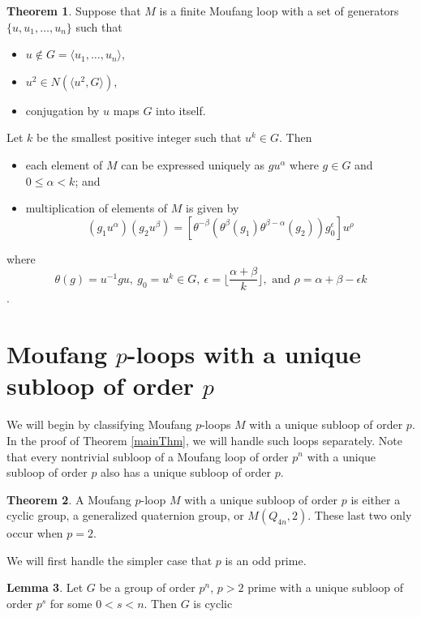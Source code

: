 \documentclass[12pt]{report}
\theoremstyle{definition}
\newtheorem{thm}{Theorem}[chapter]
\newtheorem{lem}[thm]{Lemma}
\begin{document}
\begin{thm}\label{thm-chein}
  Suppose that $M$ is a finite Moufang loop with a set of generators $\{u, u_1, \ldots, u_n\}$ such that
  \begin{itemize}
    \item $u\notin G = \langle u_1,\ldots, u_n\rangle$,
    \item $u^2\in N(\langle u^2, G\rangle)$,
    \item conjugation by $u$ maps $G$ into itself.
  \end{itemize}
  Let $k$ be the smallest positive integer such that $u^k\in G$. Then
  \begin{itemize}
    \item each element of $M$ can be expressed uniquely as $gu^\alpha$ where $g\in G$ and $0\leq \alpha < k$; and
    \item multiplication of elements of $M$ is given by
    \[(g_1u^\alpha)(g_2u^\beta) = [\theta^{-\beta}(\theta^\beta(g_1)\theta^{\beta - \alpha}(g_2))g_0^\epsilon]u^\rho\]
  \end{itemize}
  where
  \[\theta(g) = u^{-1}gu,\: g_0 = u^k\in G,\: \epsilon = \lfloor\frac{\alpha + \beta}{k}\rfloor,\text{ and }
    \rho = \alpha + \beta - \epsilon k\] \cite{Chein}.
\end{thm}


\section{Moufang $p$-loops with a unique subloop of order $p$}

We will begin by classifying Moufang $p$-loops $M$ with a unique subloop of order $p$. In the proof of
  Theorem \ref{mainThm}, we will handle such loops separately. Note that every nontrivial subloop of a
  Moufang loop of order $p^n$ with a unique subloop of order $p$ also has a unique subloop of order $p$.

\begin{thm}
    A Moufang $p$-loop $M$ with a unique subloop of order $p$ is either a cyclic group, a generalized
      quaternion group, or $M(Q_{4n}, 2)$. These last two only occur when $p = 2$.
\end{thm}

We will first handle the simpler case that $p$ is an odd prime.

\begin{lem}\label{lem-burnside}
  Let $G$ be a group of order $p^n$, $p > 2$ prime with a unique subloop of order $p^s$ for some $0 < s < n$.
    Then $G$ is cyclic \cite{Burnside}
\end{lem}
\end{document}

